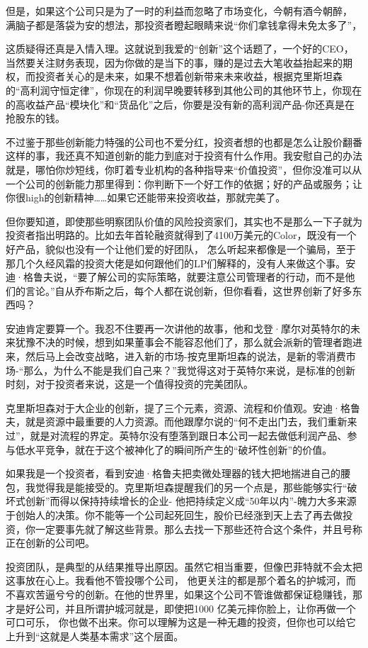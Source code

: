 但是，如果这个公司只是为了一时的利益而忽略了市场变化，今朝有酒今朝醉，
满脑子都是落袋为安的想法，那投资者瞪起眼睛来说``你们拿钱拿得未免太多了''，

这质疑得还真是入情入理。这就说到我爱的``创新''这个话题了，一个好的CEO，当然要关注财务表现，因为你做的是当下的事，赚的是过去大笔收益抬起来的期权，而投资者关心的是未来，如果不想着创新带来未来收益，根据克里斯坦森的``高利润守恒定律''，你现在的利润早晚要转移到其他公司的其他环节上，你现在的高收益产品``模块化''和``货品化''之后，你要是没有新的高利润产品-你还真是在抢股东的钱。

不过鉴于那些创新能力特强的公司也不爱分红，投资者想的也都是怎么让股价翻番这样的事，我还真不知道创新的能力到底对于投资有什么作用。我安慰自己的办法就是，哪怕你炒短线，你盯着专业机构的各种指导来``价值投资''，但你没准可以从一个公司的创新能力那里得到：你判断下一个好工作的依据；好的产品或服务；让你很high的创新精神\ldots\ldots 如果它还能带来投资收益，那就完美了。

但你要知道，即使那些明察团队价值的风险投资家们，其实也不是那么一下子就为投资者指出明路的。比如去年首轮融资就得到了4100万美元的Color，既没有一个好产品，貌似也没有一个让他们爱的好团队，
怎么听起来都像是一个骗局，至于那几个久经风霜的投资大佬是如何跟他们的LP们解释的，没有人来做这个事。安迪·格鲁夫说，``要了解公司的实际策略，就要注意公司管理者的行动，而不是他们的言论。''自从乔布斯之后，每个人都在说创新，但你看看，这世界创新了好多东西吗？

安迪肯定要算一个。我忍不住要再一次讲他的故事，他和戈登·摩尔对英特尔的未来犹豫不决的时候，想到如果董事会不能容忍他们了，那么就会派新的管理者跑进来，然后马上会改变战略，进入新的市场-按克里斯坦森的说法，是新的零消费市场-``那么，为什么不能是我们自己来？''我觉得这对于英特尔来说，是标准的创新时刻，对于投资者来说，这是一个值得投资的完美团队。

克里斯坦森对于大企业的创新，提了三个元素，资源、流程和价值观。安迪·格鲁夫，就是资源中最重要的人力资源。而他跟摩尔说的``何不走出门去，我们重新来过''，就是对流程的界定。英特尔没有堕落到跟日本公司一起去做低利润产品、参与低水平竞争，就在于这个被神化了的瞬间所产生的``破坏性创新''的价值。

如果我是一个投资者，看到安迪·格鲁夫把卖微处理器的钱大把地揣进自己的腰包，我觉得我是能接受的。克里斯坦森提醒我们的另一个点是，那些能够实行``破坏式创新''而得以保持持续增长的企业-
他把持续定义成``50年以内''-魄力大多来源于创始人的决策。你不能等一个公司起死回生，股价已经涨到天上去了再去做投资，你一定要事先就了解这些背景。那么去找一下那些还符合这个条件，并且号称正在创新的公司吧。

投资团队，是典型的从结果推导出原因。虽然它相当重要，但像巴菲特就不会太把这事放在心上。我看他不管投哪个公司，
他更关注的都是那个着名的护城河，而不喜欢苦逼兮兮的创新。在他的世界里，如果这个公司不管谁做都保证稳赚钱，那才是好公司，并且所谓护城河就是，即使把1000
亿美元摔你脸上，让你再做一个可口可乐，
你也做不出来。你可以理解为这是一种无趣的投资，但你也可以给它上升到``这就是人类基本需求''这个层面。

